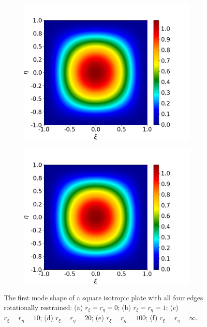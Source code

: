 \documentclass[preprint,12pt]{elsarticle}
\begin{document}
\begin{figure}
\begin{subfigure}[b]{0.49\textwidth}
		\includegraphics[width=\textwidth]{figs/iso100.png}
		\caption[]%
		{{\small}}    
		\label{fig:iso100}
	\end{subfigure}
	\hfill
	\begin{subfigure}[b]{0.49\textwidth}   
		\centering 
		\includegraphics[width=\textwidth]{figs/isoinf.png}
		\caption[]%
		{{\small }}    
		\label{fig:isoinf}
	\end{subfigure}
	\caption[]  
	{\small The first mode shape of a square isotropic plate with all four edges rotationally restrained: (a) \(r_{\xi} = r_{\eta} = 0\); (b) \(r_{\xi} = r_{\eta} = 1\); (c) \(r_{\xi} = r_{\eta} = 10\); (d) \(r_{\xi} = r_{\eta} = 20\); (e) \(r_{\xi} = r_{\eta} = 100\); (f) \(r_{\xi} = r_{\eta} = \infty\).}  
	\label{fig:iso}  
\end{figure}
\end{document}
